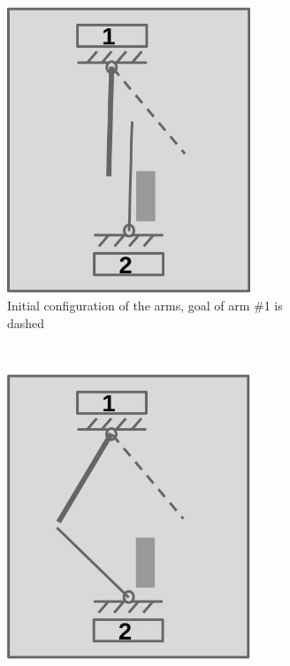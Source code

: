 \documentclass[english]{article}
\theoremstyle{definition}
\begin{document}
\begin{figure}[t]
    \centering
    \begin{subfigure}[b]{0.3\textwidth}
    		\centering
        \includegraphics[width=0.8\textwidth]{initial_configuration}
        \caption{Initial configuration of the arms, goal of arm \#1 is dashed \\ }
        \label{fig:initial_configuration}
    \end{subfigure}
    ~
    \begin{subfigure}[b]{0.3\textwidth}
    		\centering
        \includegraphics[width=0.8\textwidth]{breaking_point}

\end{subfigure}
\end{figure}
\end{document}
